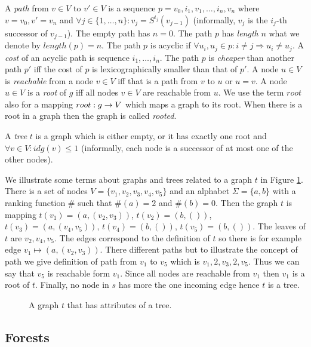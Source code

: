 A \emph{path} from $v\in V$ to $v' \in V$ is a sequence $p=v_0, i_1, v_1, \ldots, i_n, v_n$ where $v=v_0, v' = v_n$
and $\forall j \in \{1,\ldots,n\}: v_j = S^{i_j}(v_{j-1})$ (informally, $v_j$ is the $i_j$-th successor of $v_{j-1}$).
The empty path has $n=0$.
The path $p$ has \emph{length} $n$ what we denote by $length(p) = n$.
The path $p$ is acyclic if $\forall u_i,u_j \in p: i \neq j \Rightarrow u_i \neq u_j$.
A \emph{cost} of an acyclic path is sequence $i_1, \ldots, i_n$.
The path $p$ is \emph{cheaper} than another path $p'$ iff the cost of $p$ is lexicographically smaller than that of $p'$. 
A node $u \in V$ is \emph{reachable} from a node $v \in V$ iff that is a path from $v$ to $u$ or $u=v$.
A node $u \in V$ is a \emph{root} of $g$ iff all nodes $v \in V$ are reachable from $u$.
We use the term $root$ also for a mapping $root: g \rightarrow V$ which maps a graph to its root.
When there is a root in a graph then the graph is called \emph{rooted}.

A \emph{tree} $t$ is a graph which is either empty, or it has exactly one root and $\forall v \in V: idg(v) \leq 1$ (informally,
each node is a successor of at most one of the other nodes).

\bexmp
We illustrate some terms about graphs and trees related to a graph $t$ in Figure \ref{fig:graph_tree}.
There is a set of nodes $V=\{v_1,v_2,v_3,v_4,v_5\}$ and
an alphabet $\Sigma = \{a,b\}$ with a ranking function $\#$ such that $\#(a) = 2$ and $\#(b) = 0$.
Then the graph $t$ is mapping $t(v_1) = (a, (v_2,v_3))$, $t(v_2) = (b, ())$,
$t(v_3) = (a, (v_4, v_5))$, $t(v_4) = (b, ())$, $t(v_5) = (b, ())$.
The leaves of $t$ are $v_2, v_4, v_5$.
The edges correspond to the definition of $t$ so there is for example
edge $v_1 \mapsto (a,(v_2,v_3))$.
There different paths but to illustrate the concept of path we give
definition of path from $v_1$ to $v_5$ which is $v_1, 2, v_3, 2, v_5$.
Thus we can say that $v_5$ is reachable form $v_1$.
Since all nodes are reachable from $v_1$ then $v_1$ is a root of $t$.
Finally, no node in $s$ has more the one incoming edge hence $t$ is a tree.

	\begin{figure}[bth]
		\begin{center}
			
		\end{center}
		\caption{A graph $t$ that has attributes of a tree.}
		\label{fig:graph_tree}
	\end{figure}
	\label{ex:graph}
\eexmp

\subsection{Forests}
\label{subsec:forests}


